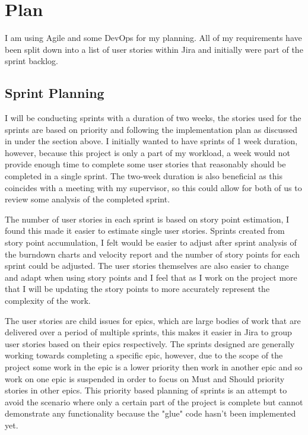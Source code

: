 \documentclass[12pt, a4paper]{article}
\begin{document}
\section{Plan} \label{sec:plan}

I am using Agile and some DevOps for my planning. All of my requirements have been split down into
a list of user stories within Jira and initially were part of the sprint backlog.

\subsection{Sprint Planning}

I will be conducting sprints with a duration of two weeks, the stories used for the sprints are
based on priority and following the implementation plan as discussed in \textbf{}
under the \textbf{} section above. I initially wanted to have sprints of 1 week 
duration, however, because this project is only a part of my workload, a week would not provide enough
time to complete some user stories that reasonably should be completed in a single sprint. The
two-week duration is also beneficial as this coincides with a meeting with my supervisor, so this could
allow for both of us to review some analysis of the completed sprint.

The number of user stories in each sprint is based on story point estimation, I found this made it
easier to estimate single user stories. Sprints created from story point accumulation, I felt would
be easier to adjust after sprint analysis of the burndown charts and velocity report and the number
of story points for each sprint could be adjusted. The user stories themselves are also easier to
change and adapt when using story points and I feel that as I work on the project more that I will
be updating the story points to more accurately represent the complexity of the work.

The user stories are child issues for epics, which are large bodies of work that are delivered over
a period of multiple sprints, this makes it easier in Jira to group user stories based on their epics
respectively. The sprints designed are generally working towards completing a specific epic, however,
due to the scope of the project some work in the epic is a lower priority then work in another
epic and so work on one epic is suspended in order to focus on Must and Should priority stories in 
other epics. This priority based planning of sprints is an attempt to avoid the scenario where only
a certain part of the project is complete but cannot demonstrate any functionality because the
"glue" code hasn't been implemented yet.
\end{document}
